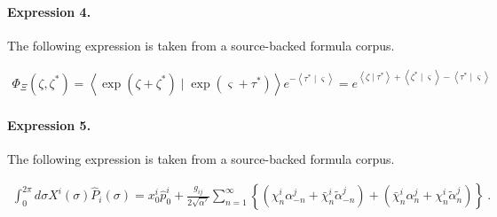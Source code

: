 \documentclass[11pt]{article}
\begin{document}
\paragraph{Expression 4.} The following expression is taken from a source-backed formula corpus.

\begin{align*}\Phi _\Xi (\zeta ,\zeta ^{*})=\left\langle \exp (\zeta +\zeta ^{*})\mid \exp(\varsigma +\tau ^{*})\right\rangle e^{-\left\langle \tau ^{*}\mid \varsigma\right\rangle }=e^{\left\langle \zeta \mid \tau ^{*}\right\rangle+\left\langle \zeta ^{*}\mid \varsigma \right\rangle -\left\langle \tau^{*}\mid \varsigma \right\rangle } \end{align*}

\paragraph{Expression 5.} The following expression is taken from a source-backed formula corpus.

\begin{align*}\int^{2\pi}_{0} d\sigma X^{i}(\sigma)\hat{P}_{i}(\sigma) =x^{i}_{0}\hat{p}^{i}_{0} +\frac{g_{ij}}{2\sqrt{\alpha'}} \sum_{n=1}^{\infty}\left\{ \left( \chi_{n}^{i}\alpha^{j}_{-n} +\bar{\chi}^{i}_{n}\tilde{\alpha}^{j}_{-n} \right) +\left(\bar{\chi}_{n}^{i}\alpha^{j}_{n} +\chi_{n}^{i} \tilde{\alpha}^{j}_{n}\right) \right\}~.\end{align*}
\end{document}
